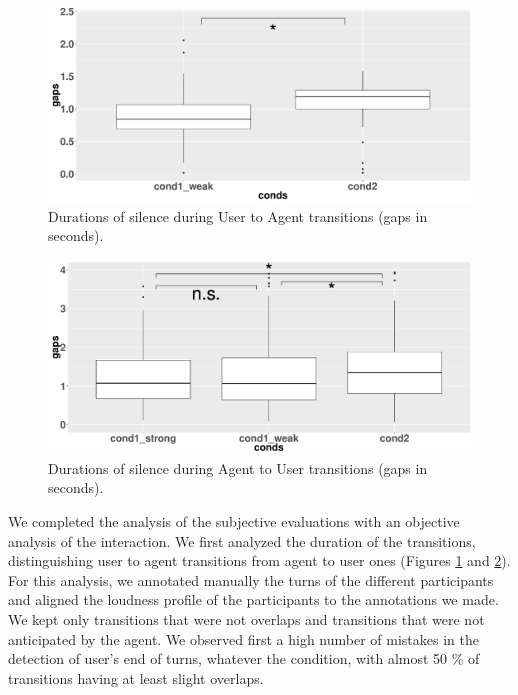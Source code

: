 \begin{figure}
\centering
\includegraphics[width=\linewidth]{figure/boxTransitionsUA.pdf}
\caption{Durations of silence during User to Agent transitions (gaps in seconds).}
\label{box_ua}
\end{figure}

\begin{figure}
\centering
\includegraphics[width=\linewidth]{figure/boxTransitionsAU.pdf}
\caption{Durations of silence during Agent to User transitions (gaps in seconds).}
\label{box_au}
\end{figure}


We completed the analysis of the subjective evaluations with an objective analysis of the interaction. 
We first analyzed the duration of the transitions, distinguishing user to agent transitions from agent to user ones (Figures \ref{box_ua} and \ref{box_au}).
For this analysis, we annotated manually the turns of the different participants and aligned the loudness profile of the participants to the annotations we made. We kept only transitions that were not overlaps and transitions that were not anticipated by the agent. We observed first a high number of mistakes in the detection of user's end of turns, whatever the condition, with almost 50 \% of transitions having at least slight overlaps.  


